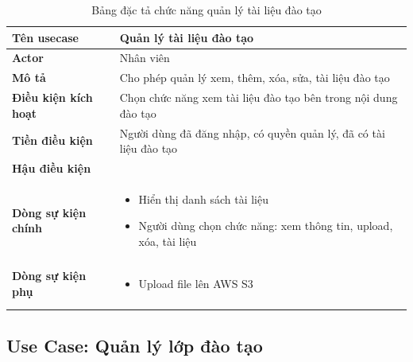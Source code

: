 \documentclass[report.tex]{subfiles}
\begin{document}
\begin{table}[!ht]
\begin{longtable}{|p{4cm}|p{12cm}|}
\hline
\textbf{Tên usecase} & \textbf{Quản lý tài liệu đào tạo} \\
\hline
\textbf{Actor} & Nhân viên\\
\hline
\textbf{Mô tả} & Cho phép quản lý xem, thêm, xóa, sửa, tài liệu đào tạo \\
\hline
\textbf{Điều kiện kích hoạt} & Chọn chức năng xem tài liệu đào tạo bên trong nội dung đào tạo \\
\hline
\textbf{Tiền điều kiện} & Người dùng đã đăng nhập, có quyền quản lý, đã có tài liệu đào tạo \\
\hline
\textbf{Hậu điều kiện} & \\
\hline
\textbf{Dòng sự kiện chính} &
\begin{itemize}[noitemsep]
  \item Hiển thị danh sách tài liệu
  \item Người dùng chọn chức năng: xem thông tin, upload, xóa, tài liệu
\end{itemize}\\
\hline
\textbf{Dòng sự kiện phụ} & 
\begin{itemize}[noitemsep]
  \item Upload file lên AWS S3
\end{itemize}\\
\hline
\caption{Bảng đặc tả chức năng quản lý tài liệu đào tạo}
\end{longtable}
\end{table}
\FloatBarrier

\subsection{Use Case: Quản lý lớp đào tạo}
\end{document}
